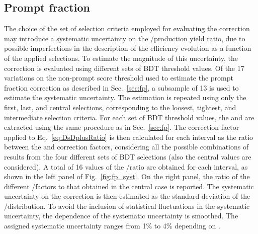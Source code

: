 \subsection{Prompt fraction}
The choice of the set of selection criteria employed for evaluating the \fp correction may introduce a systematic uncertainty on the \ds/\dpl production yield ratio, due to possible imperfections in the description of the efficiency evolution as a function of the applied selections. To estimate the magnitude of this uncertainty, the \fp correction is evaluated using different sets of BDT threshold values. Of the 17 variations on the non-prompt score threshold used to estimate the prompt fraction correction as described in Sec.~\ref{sec:fp}, a subsample of 13 is used to estimate the systematic uncertainty. The \fp estimation is repeated using only the first, last, and central selections, corresponding to the loosest, tightest, and intermediate selection criteria. For each set of BDT threshold values, the \fpds and \fpdpl are extracted using the same procedure as in Sec.~\ref{sec:fp}. The correction factor applied to Eq.~\ref{eq:DsDplusRatio} is then calculated for each \pt interval as the ratio between the \fpds and \fpdpl correction factors, considering all the possible combinations of results from the four different sets of BDT selections (also the central values are considered). A total of 16 values of the \fpds/\fpdpl ratio are obtained for each \pt interval, as shown in the left panel of Fig.~\ref{fig:fp_syst}. On the right panel, the ratio of the different \fpds/\fpdpl factors to that obtained in the central case is reported. The systematic uncertainty on the \fp correction is then estimated as the standard deviation of the \fpds/\fpdpl distribution. To avoid the inclusion of statistical fluctuations in the systematic uncertainty, the \pt dependence of the systematic uncertainty is smoothed. The assigned systematic uncertainty ranges from 1\% to 4\% depending on \pt.

